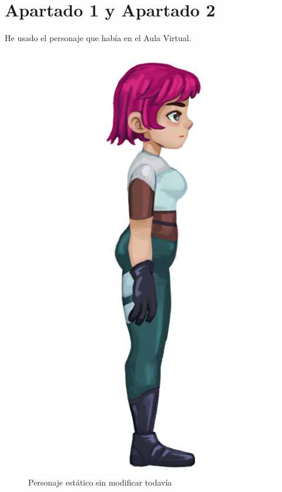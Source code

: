 \documentclass[12pt]{article}
\begin{document}
\section{Apartado 1 y Apartado 2}
    He usado el personaje que había en el Aula Virtual.
    \begin{figure}[H]
        \centering
        \includegraphics[height=0.8\textheight]{imgs/2D-Character_mio.png}
        \caption{Personaje estático sin modificar todavía}
        \label{fig:static}
    \end{figure}

\newpage
\end{document}
